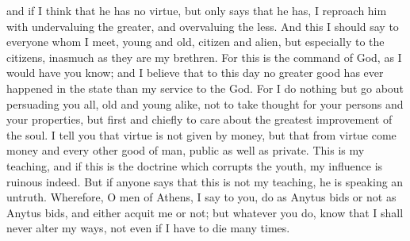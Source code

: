 \documentclass[12pt]{article}
\begin{document}
and if I think that he has no virtue, but only says that he has, I
reproach him with undervaluing the greater, and overvaluing the less.
And this I should say to everyone whom I meet, young and old, citizen
and alien, but especially to the citizens, inasmuch as they are my
brethren. For this is the command of God, as I would have you know;
and I believe that to this day no greater good has ever happened in
the state than my service to the God. For I do nothing but go about
persuading you all, old and young alike, not to take thought for your
persons and your properties, but first and chiefly to care about the
greatest improvement of the soul. I tell you that virtue is not given
by money, but that from virtue come money and every other good of
man, public as well as private. This is my teaching, and if this is
the doctrine which corrupts the youth, my influence is ruinous indeed.
But if anyone says that this is not my teaching, he is speaking an
untruth. Wherefore, O men of Athens, I say to you, do as Anytus bids
or not as Anytus bids, and either acquit me or not; but whatever you
do, know that I shall never alter my ways, not even if I have to die
many times.
\end{document}
